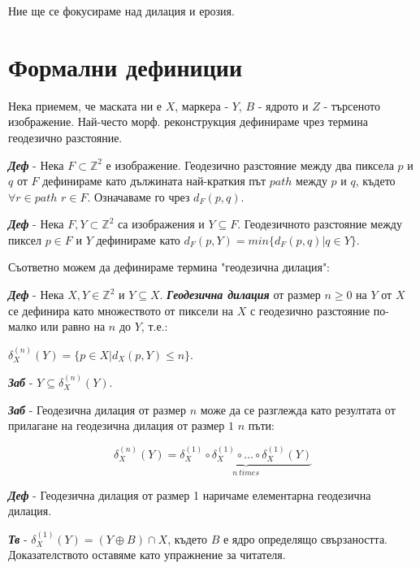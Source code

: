 \documentclass[fleqn,12pt]{article}
\begin{document}
Ние ще се фокусираме над дилация и ерозия.

\section{Формални дефиниции}

Нека приемем, че маската ни е $X$, маркера - $Y$, $B$ - ядрото и $Z$ - търсеното изображение. Най-често морф. реконструкция дефинираме чрез термина геодезично разстояние.

\bigbreak

\textit{\textbf{Деф}} - Нека $F \subset \mathbb{Z}^2$ е изображение. Геодезично разстояние между два пиксела $p$ и $q$ от $F$ дефинираме като дължината най-краткия път $path$ между $p$ и $q$, където $\forall r \in path$ $r \in F$. Означаваме го чрез $d_F (p, q)$.

\bigbreak

\textit{\textbf{Деф}} - Нека $F, Y \subset \mathbb{Z}^2$ са изображения и $Y \subseteq F$. Геодезичното разстояние между пиксел $p \in F$ и $Y$ дефинираме като $d_F (p, Y) = min\{d_F (p, q) | q \in Y\}$.

\bigbreak

Съответно можем да дефинираме термина "геодезична дилация":

\textit{\textbf{Деф}} - Нека $X, Y \in \mathbb{Z}^2$ и $Y \subseteq X$. \textbf{\textit{Геодезична дилация}} от размер $n \geq 0$ на $Y$ от $X$ се дефинира като множеството от пиксели на $X$ с геодезично разстояние по-малко или равно на $n$ до $Y$, т.е.:

\begin{center}
    $\delta_X^{(n)} (Y) = \{p \in X | d_X (p, Y) \leq n\}$. 
\end{center}


\bigbreak

\textit{\textbf{Заб}} - $Y \subseteq \delta_X^{(n)} (Y)$.

\bigbreak

\textit{\textbf{Заб}} - Геодезична дилация от размер $n$ може да се разглежда като резултата от прилагане на геодезична дилация от размер $1$ $n$ пъти:

$$
    \delta_X^{(n)} (Y) = \underbrace{\delta_X^{(1)} \circ \delta_X^{(1)} \circ \dots \circ \delta_X^{(1)} (Y)}_{n\ times}
$$

\textit{\textbf{Деф}} - Геодезична дилация от размер 1 наричаме елементарна геодезична дилация.

\bigbreak

\textit{\textbf{Тв}} - $\delta_X^{(1)} (Y) = (Y \oplus B) \cap X$, където $B$ е ядро определящо свързаността. Доказателството оставяме като упражнение за читателя.
\end{document}
